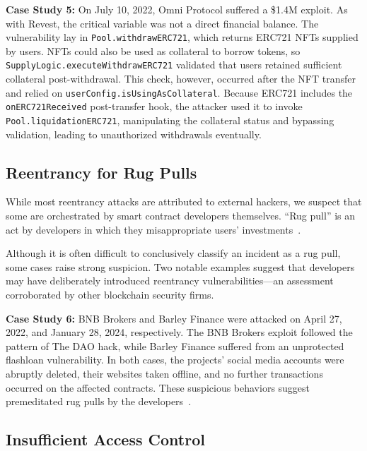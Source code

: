 \textbf{Case Study 5:} \label{case-study:5} On July 10, 2022, Omni Protocol suffered a \$1.4M exploit. As with Revest, the critical variable was not a direct financial balance. The vulnerability lay in \lstinline{Pool.withdrawERC721}, which returns ERC721 NFTs supplied by users. NFTs could also be used as collateral to borrow tokens, so \lstinline{SupplyLogic.executeWithdrawERC721} validated that users retained sufficient collateral post-withdrawal. This check, however, occurred after the NFT transfer and relied on \lstinline{userConfig.isUsingAsCollateral}. Because ERC721 includes the \lstinline{onERC721Received} post-transfer hook, the attacker used it to invoke \lstinline{Pool.liquidationERC721}, manipulating the collateral status and bypassing validation, leading to unauthorized withdrawals eventually.


\subsection{Reentrancy for Rug Pulls}

While most reentrancy attacks are attributed to external hackers, we suspect that some are orchestrated by smart contract developers themselves.
``Rug pull'' is an act by developers in which they misappropriate users' investments~\cite{rug-pull-report}. 

Although it is often difficult to conclusively classify an incident as a rug pull, some cases raise strong suspicion. Two notable examples suggest that developers may have deliberately introduced reentrancy vulnerabilities—an assessment corroborated by other blockchain security firms.

\textbf{Case Study 6:} \label{case-study:6} BNB Brokers and Barley Finance were attacked on April 27, 2022, and January 28, 2024, respectively. The BNB Brokers exploit followed the pattern of The DAO hack, while Barley Finance suffered from an unprotected flashloan vulnerability. In both cases, the projects' social media accounts were abruptly deleted, their websites taken offline, and no further transactions occurred on the affected contracts. These suspicious behaviors suggest premeditated rug pulls by the developers~\cite{bnb-brokers-newsletter, attack-report:barley-finance}.




\subsection{Insufficient Access Control}
\label{qualitative:insufficient-access-control}

